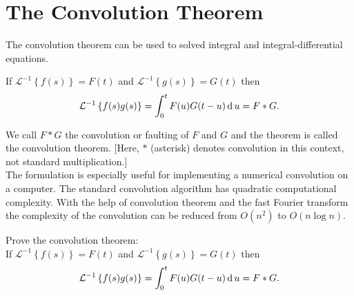 \documentclass[12pt,class=book,crop=false]{standalone}
\newcommand{\ilap}[1]{\mathcal{L}^{-1}\left\{ #1\right\}}
\begin{document}
\section{The Convolution Theorem}
The convolution theorem can be used to solved integral and integral-differential equations.
\begin{thm}
    If $ \ilap{f(s)}=F(t) $ and $ \ilap{g(s)}=G(t) $ then
    \[
        \ilap{f(s)g(s)}=\int_0^t F(u) G(t-u) \D u=F*G.
    \]
\end{thm}

We call $ F*G $ the convolution or faulting of $ F $ and $ G $ and the theorem is called the convolution theorem. [Here, $ * $ (asterisk) denotes convolution in this context, not standard multiplication.]\\

The formulation is especially useful for implementing a numerical convolution on a computer. The standard convolution algorithm has quadratic computational complexity. With the help of convolution theorem and the fast Fourier transform the complexity of the convolution can be reduced from $ O(n^2) $ to $ O(n\log n) $.
\begin{prob}
    Prove the convolution theorem:\\
    If $ \ilap{f(s)}=F(t) $ and $ \ilap{g(s)}=G(t) $ then
    \[
        \ilap{f(s)g(s)}=\int_0^t F(u) G(t-u) \D u=F*G.
    \]
\end{prob}
\end{document}

